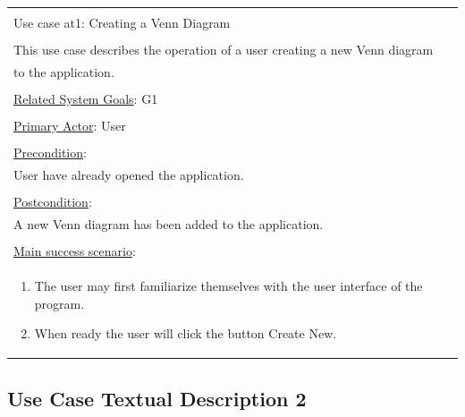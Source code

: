 \documentclass[fontsize=12pt,paper=letter,twoside]{scrartcl}
\begin{document}
\begin{table}[h]
	\begin{tabular}{|l|}
		\hline
		\\
		Use case at1: Creating a Venn Diagram													\\
		\\
		This use case describes the operation of a user creating a new Venn diagram 			\\
		to the application. 																\\
		\\
		\underline{Related System Goals}: G1												\\
		\\
		\underline{Primary Actor}: User														\\
		\\
		\underline{Precondition}:															\\ \qquad
		User have already opened the application. 											\\
		\\
		\underline{Postcondition}:															\\ \qquad
		A new Venn diagram has been added to the application.								\\
		\\
		\underline{Main success scenario}:													\\
		\begin{minipage}{6in}
			\vskip 4pt
			\begin{enumerate}
				\item The user may first familiarize themselves with the user interface
						of the program.
				\item When ready the user will click the button Create New.
			\end{enumerate}
			\vskip 4pt
		\end{minipage}
		\\
		\hline
	\end{tabular}
\end{table}

\newpage

\subsection*{Use Case Textual Description 2}
\end{document}
